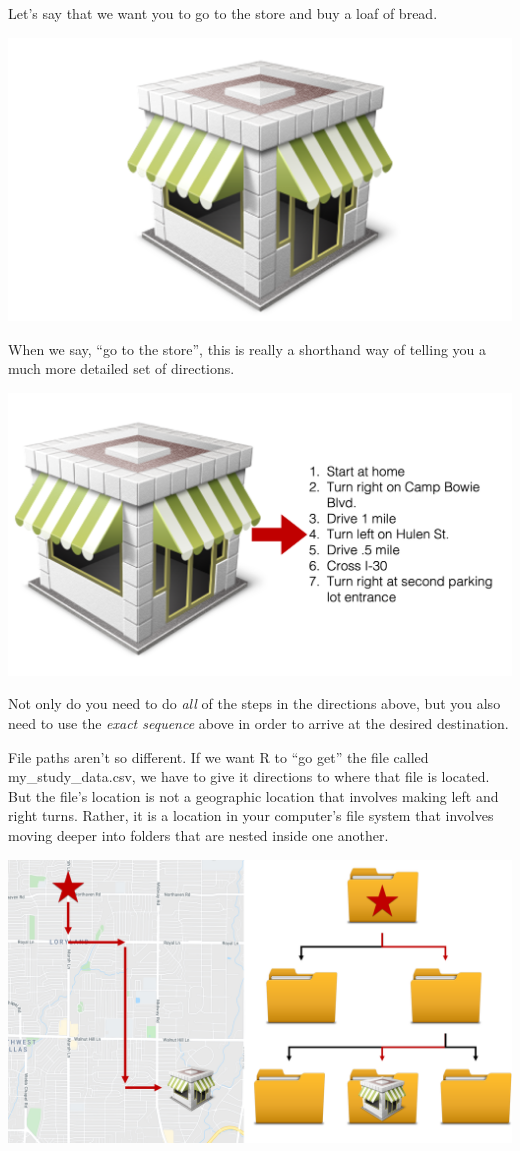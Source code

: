 \documentclass[
  letterpaper,
  DIV=11,
  numbers=noendperiod]{scrreprt}
\begin{document}
Let's say that we want you to go to the store and buy a loaf of bread.

\includegraphics{chapters/file_paths/store.png}

When we say, ``go to the store'', this is really a shorthand way of
telling you a much more detailed set of directions.

\includegraphics{chapters/file_paths/directions.png}

Not only do you need to do \emph{all} of the steps in the directions
above, but you also need to use the \emph{exact sequence} above in order
to arrive at the desired destination.

File paths aren't so different. If we want R to ``go get'' the file
called my\_study\_data.csv, we have to give it directions to where that
file is located. But the file's location is not a geographic location
that involves making left and right turns. Rather, it is a location in
your computer's file system that involves moving deeper into folders
that are nested inside one another.

\includegraphics{chapters/file_paths/locations.png}
\end{document}

